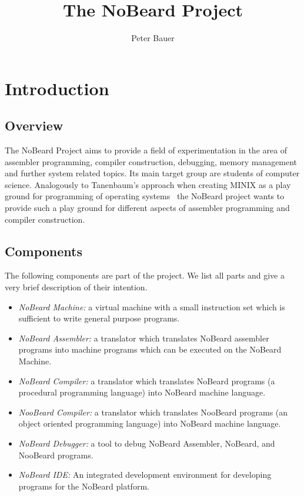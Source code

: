 \documentclass[11pt]{article}
\title{The NoBeard Project}
\author{Peter Bauer}
\begin{document}
\maketitle
\section{Introduction}
\subsection{Overview}
The NoBeard Project aims to provide a field of experimentation in the area of assembler programming, compiler construction, debugging, memory management and further system related topics. Its main target group are students of computer science. Analogously to Tanenbaum's approach when creating MINIX as a play ground for programming of operating systems~\cite{tanenbaum_modern_2009} the NoBeard project wants to provide such a play ground for different aspects of assembler programming and compiler construction.

\subsection{Components}
The following components are part of the project. We list all parts and give a very brief description of their intention.

\begin{itemize}
	\item \emph{NoBeard Machine:} a virtual machine with a small instruction set which is sufficient to write general purpose programs.
	\item \emph{NoBeard Assembler:} a translator which translates NoBeard assembler programs into machine programs which can be executed on the NoBeard Machine.
	\item \emph{NoBeard Compiler:} a translator which translates NoBeard programs (a procedural programming language) into NoBeard machine language.
	\item \emph{NooBeard Compiler:} a translator which translates NooBeard programs (an object oriented programming language) into NoBeard machine language.
	\item \emph{NoBeard Debugger:} a tool to debug NoBeard Assembler, NoBeard, and NooBeard programs. 
	\item \emph{NoBeard IDE:} An integrated development environment for developing programs for the NoBeard platform.
\end{itemize}
\end{document}
